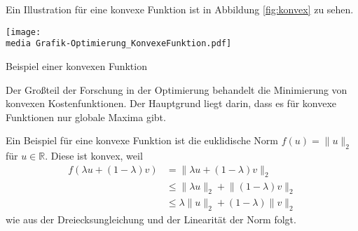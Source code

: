 Ein Illustration f\"ur eine konvexe Funktion ist in Abbildung \ref{fig:konvex} zu sehen. 
\begin{dsafigure}
\begin{center}
\texttt{[image: \\media Grafik-Optimierung\_KonvexeFunktion.pdf]}
\caption{Beispiel einer konvexen Funktion}
\label{fig:konvex}
\end{center}
\end{dsafigure}
Der Gro\ss teil der Forschung in der Optimierung behandelt die Minimierung von konvexen Kostenfunktionen. Der Hauptgrund liegt darin, dass es f\"ur konvexe Funktionen nur globale Maxima gibt. 


\begin{Bsp}
Ein Beispiel für eine konvexe Funktion ist die euklidische Norm $f(u) = \lVert u\rVert_2$ für $u\in\mathbb{R}$. Diese ist konvex, weil
\begin{align*}
f(\lambda u+(1-\lambda)v) &=\lVert\lambda u+(1-\lambda)v\rVert_2\\
&\leq\lVert\lambda u\rVert_2+\lVert(1-\lambda)v\rVert_2\\
&\leq\lambda\lVert u\rVert_2+(1-\lambda)\lVert v\rVert_2
\end{align*}
wie aus der Dreiecksungleichung und der Linearität der Norm folgt.
\end{Bsp}
